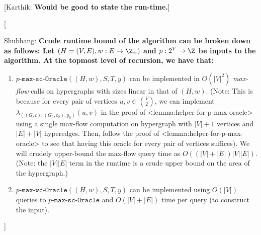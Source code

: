 \documentclass{article}
\def\Cref#1{<#1>}%
\newcommand{\functionMaximizationOracle}[1]{\ensuremath{{#1}\text{-}\mathtt{max}\text{-}\mathtt{wc}\text{-}\mathtt{Oracle}}\xspace}
\newcommand{\functionMaximizationOracleStrongCover}[1]{\ensuremath{{#1}\text{-}\mathtt{max}\text{-}\mathtt{sc}\text{-}\mathtt{Oracle}}\xspace}
\newcommand{\shubhang}[1]{{\color{blue}[{\tiny Shubhang: \bf #1}]\marginpar{\color{blue}*}}}
\newcommand{\knote}[1]{{\color{red}[{\tiny Karthik: \bf #1}]\marginpar{\color{red}*}}}
\begin{document}
\iffalse
\knote{Would be good to state the run-time.}
\shubhang{Crude runtime bound of the algorithm can be broken down as follows: Let $(H = (V, E),w:E\rightarrow\Z_+)$ and $p:2^V\rightarrow\Z$ be inputs to the algorithm. At the topmost level of recursion, we have that:
\begin{enumerate}
    \item $\functionMaximizationOracleStrongCover{p}((H,w), S, T , y)$ can be implemented in $O(|V|^2)$ \emph{max-flow} calls on hypergraphs with sizes linear in that of $(H,w)$. (Note: This is because for every pair of vertices $u,v \in {V\choose 2}$, we can implement $\lambda_{((G, c), (G_0, c_0), y_0)}(u, v)$ in the proof of \Cref{lemma:helper-for-p-max-oracle} using a single max-flow computation on hypergraph with $|V|+1$ vertices and $|E| + |V|$ hyperedges. Then, follow the proof of \Cref{lemma:helper-for-p-max-oracle} to see that having this oracle for every pair of vertices suffices). We will crudely upper-bound the max-flow query time as $O((|V|+|E|)|V||E|)$.
    (Note: the $|V||E|$ term in the runtime is a crude upper bound on the area of the hypergraph.)
    \item $\functionMaximizationOracle{p}((H,w), S, T, y)$ can be implemented using $O(|V|)$ queries to $\functionMaximizationOracleStrongCover{p}$ and $O(|V| + |E|)$ time per query (to construct the input). 
    \end{enumerate}
    
}
\end{document}

